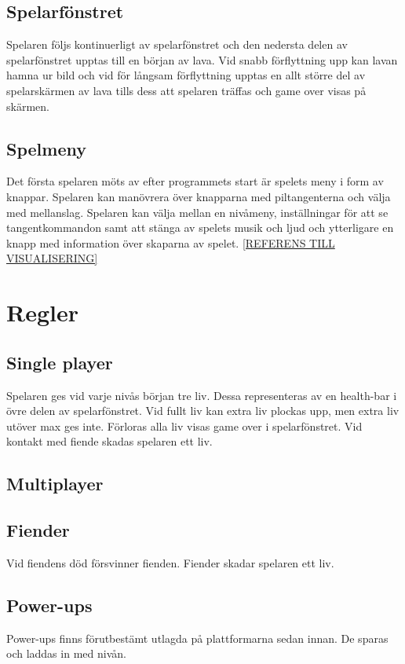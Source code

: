 \documentclass{TDP005mall}
\begin{document}
\subsection{Spelarfönstret}
Spelaren följs kontinuerligt av spelarfönstret och den nedersta delen av spelarfönstret upptas till en början av lava. Vid snabb förflyttning upp kan lavan hamna ur bild och vid för långsam förflyttning upptas en allt större del av spelarskärmen av lava tills dess att spelaren träffas och game over visas på skärmen.


\subsection{Spelmeny}
Det första spelaren möts av efter programmets start är spelets meny i form av knappar. Spelaren kan manövrera över knapparna med piltangenterna och välja med mellanslag. Spelaren kan välja mellan en nivåmeny, inställningar för att se tangentkommandon samt att stänga av spelets musik och ljud och ytterligare en knapp med information över skaparna av spelet.  \ref{REFERENS TILL VISUALISERING} 

\section{Regler}%

\subsection{Single player}
Spelaren ges vid varje nivås början tre liv. Dessa representeras av en health-bar i övre delen av spelarfönstret. Vid fullt liv kan extra liv plockas upp, men extra liv utöver max ges inte. Förloras alla liv visas game over i spelarfönstret. Vid kontakt med fiende skadas spelaren ett liv.

\subsection{Multiplayer}


\subsection{Fiender}
Vid fiendens död försvinner fienden. Fiender skadar spelaren ett liv.

\subsection{Power-ups}
Power-ups finns förutbestämt utlagda på plattformarna sedan innan. De sparas och laddas in med nivån.
\end{document}
